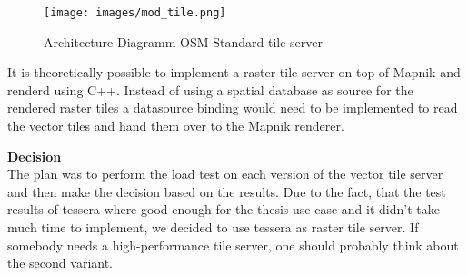 \begin{figure}[H]
\centering
  \texttt{[image: images/mod\_tile.png]}
  \caption{Architecture Diagramm OSM Standard tile server}
\end{figure}

It is theoretically possible to implement a raster tile server
on top of Mapnik and renderd using C++. Instead of using a spatial database as source for the rendered raster tiles a datasource binding would need to be implemented to read the vector tiles and hand them over to the Mapnik renderer. 

\begin{tcolorbox}\label{tile_server_decision}
\textbf{Decision} \\
The plan was to perform the load test on each version of the vector tile server and then make the decision based on the results. Due to the fact, that the test results of tessera where good enough for the thesis use case and it didn't take much time to implement, we decided to use tessera as raster tile server.
If somebody needs a high-performance tile server, one should probably think about the second variant.
\end{tcolorbox}
